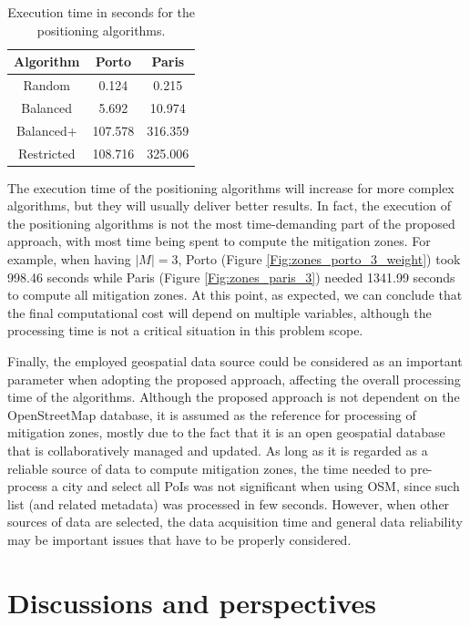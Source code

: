 \begin{refsection}
\begin{table}
    \centering
    \caption{Execution time in seconds for the positioning algorithms.}
    \label{Table:costs}
    \begin{tabular}{|c|c|c|}
        \hline
        \textbf{Algorithm} & \textbf{Porto} & \textbf{Paris} \\
        \hline
        Random  &  0.124 &  0.215 \\ 
        \hline
        Balanced  & 5.692  &  10.974 \\ 
        \hline
        Balanced+  & 107.578 &  316.359  \\ 
        \hline
        Restricted  & 108.716  & 325.006 \\ 
        \hline
    \end{tabular}
\end{table}

The execution time of the positioning algorithms will increase for more complex algorithms, but they will usually deliver better results. In fact, the execution of the positioning algorithms is not the most time-demanding part of the proposed approach, with most time being spent to compute the mitigation zones. For example, when having $|M|=3$, Porto (Figure \ref{Fig:zones_porto_3_weight}) took 998.46 seconds while Paris (Figure \ref{Fig:zones_paris_3}) needed 1341.99 seconds to compute all mitigation zones. At this point, as expected, we can conclude that the final computational cost will depend on multiple variables, although the processing time is not a critical situation in this problem scope.

Finally, the employed geospatial data source could be considered as an important parameter when adopting the proposed approach, affecting the overall processing time of the algorithms. Although the proposed approach is not dependent on the OpenStreetMap database, it is assumed as the reference for processing of mitigation zones, mostly due to the fact that it is an open geospatial database that is collaboratively managed and updated. As long as it is regarded as a reliable source of data to compute mitigation zones, the time needed to pre-process a city and select all PoIs was not significant when using OSM, since such list (and related metadata) was processed in few seconds. However, when other sources of data are selected, the data acquisition time and general data reliability may be important issues that have to be properly considered.

\section{Discussions and perspectives}
\label{S:6}


\end{refsection}
